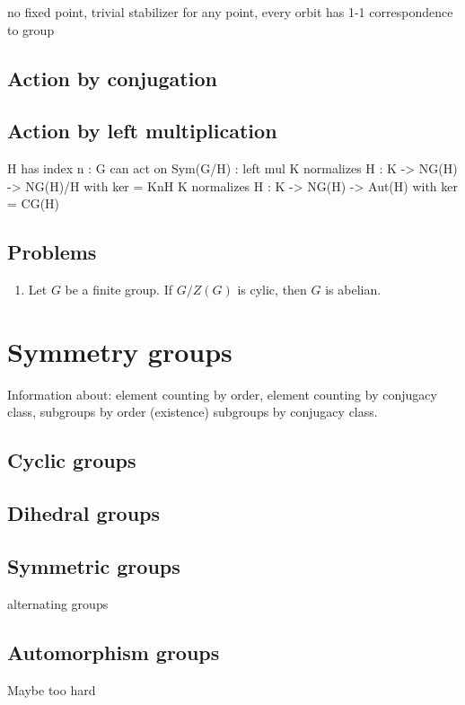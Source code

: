 \documentclass{../note}
\begin{document}
\begin{prb}
no fixed point,
trivial stabilizer for any point,
every orbit has 1-1 correspondence to group
\end{prb}

\section{Action by conjugation}


\section{Action by left multiplication}


H has index n  : G can act on Sym(G/H) : left mul
K normalizes H : K -> NG(H) -> NG(H)/H  with ker = KnH
K normalizes H : K -> NG(H) -> Aut(H)  with ker = CG(H)


\section*{Problems}
\begin{enumerate}
\item Let $G$ be a finite group. If $G/Z(G)$ is cylic, then $G$ is abelian.
\end{enumerate}

\chapter{Symmetry groups}

Information about:
element counting by order,
element counting by conjugacy class,
subgroups by order (existence)
subgroups by conjugacy class.



\section{Cyclic groups}
\section{Dihedral groups}
\section{Symmetric groups}
alternating groups

\section{Automorphism groups}
Maybe too hard
\end{document}
